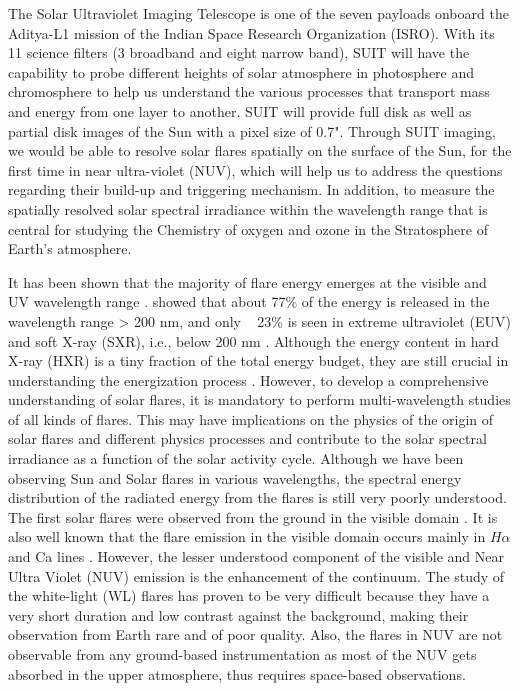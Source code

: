 {The Solar Ultraviolet Imaging Telescope \citep[SUIT;][]{ghosh16,article} is one of the seven payloads onboard the Aditya-L1 mission \citep{adityal1} of the Indian Space Research Organization (ISRO). With its 11 science filters (3 broadband and eight narrow band), SUIT will have the capability to probe different heights of solar atmosphere in photosphere and chromosphere to help us understand the various processes that transport mass and energy from one layer to another. SUIT will provide full disk as well as partial disk images of the Sun with a pixel size of 0.7". Through SUIT imaging, we would be able to resolve solar flares spatially on the surface of the Sun, for the first time in near ultra-violet (NUV), which will help us to address the questions regarding their build-up and triggering mechanism. In addition, to measure the spatially resolved solar spectral irradiance within the wavelength range that is central for studying the Chemistry of oxygen and ozone in the Stratosphere of Earth's atmosphere.

It has been shown that the majority of flare energy emerges at the visible and UV wavelength range \citep{woods06}. \cite{woods04} showed that about 77\% of the energy is released in the wavelength range > 200 nm, and only ~ 23\% is seen in extreme ultraviolet (EUV) and soft X-ray (SXR), i.e., below 200 nm \citep{Nei_1989,neidig93,kretzschmar11}. Although the energy content in hard X-ray (HXR) is a tiny fraction of the total energy budget, they are still crucial in understanding the energization process \citep{holeman11}. However, to develop a comprehensive understanding of solar flares, it is mandatory to perform multi-wavelength studies of all kinds of flares. This may have implications on the physics of the origin of solar flares and different physics processes and contribute to the solar spectral irradiance as a function of the solar activity cycle. Although we have been observing Sun and Solar flares in various wavelengths, the spectral energy distribution of the radiated energy from the flares is still very poorly understood. The first solar flares were observed from the ground in the visible domain \citep{carrington1859,neidig93}. It is also well known that the flare emission in the visible domain occurs mainly in $H\alpha$ and Ca  lines \citep{canfield90,falchi92,heinzel94}. However, the lesser understood component of the visible and Near Ultra Violet (NUV) emission is the enhancement of the continuum. The study of the white-light (WL) flares has proven to be very difficult because they have a very short duration and low contrast against the background, making their observation from Earth rare and of poor quality. Also, the flares in NUV are not observable from any ground-based instrumentation as most of the NUV gets absorbed in the upper atmosphere, thus requires space-based observations.

}

